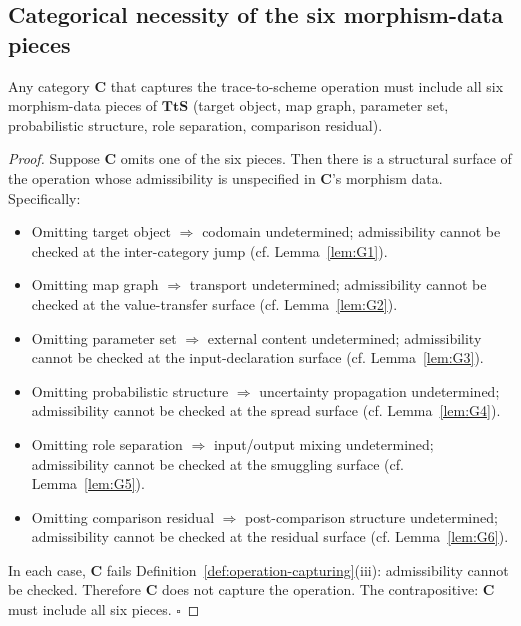 \subsection{Categorical necessity of the six morphism-data pieces}
\label{subsec:cat-necessity}

\begin{lemma}
\label{lem:cat-necessity}
Any category $\mathbf{C}$ that captures the trace-to-scheme operation must include all six morphism-data pieces of $\mathbf{TtS}$ (target object, map graph, parameter set, probabilistic structure, role separation, comparison residual).
\end{lemma}

\begin{proof}
Suppose $\mathbf{C}$ omits one of the six pieces. Then there is a structural surface of the operation whose admissibility is unspecified in $\mathbf{C}$'s morphism data. Specifically:
\begin{itemize}
\item Omitting target object $\Rightarrow$ codomain undetermined; admissibility cannot be checked at the inter-category jump (cf. Lemma~\ref{lem:G1}).
\item Omitting map graph $\Rightarrow$ transport undetermined; admissibility cannot be checked at the value-transfer surface (cf. Lemma~\ref{lem:G2}).
\item Omitting parameter set $\Rightarrow$ external content undetermined; admissibility cannot be checked at the input-declaration surface (cf. Lemma~\ref{lem:G3}).
\item Omitting probabilistic structure $\Rightarrow$ uncertainty propagation undetermined; admissibility cannot be checked at the spread surface (cf. Lemma~\ref{lem:G4}).
\item Omitting role separation $\Rightarrow$ input/output mixing undetermined; admissibility cannot be checked at the smuggling surface (cf. Lemma~\ref{lem:G5}).
\item Omitting comparison residual $\Rightarrow$ post-comparison structure undetermined; admissibility cannot be checked at the residual surface (cf. Lemma~\ref{lem:G6}).
\end{itemize}
In each case, $\mathbf{C}$ fails Definition~\ref{def:operation-capturing}(iii): admissibility cannot be checked. Therefore $\mathbf{C}$ does not capture the operation. The contrapositive: $\mathbf{C}$ must include all six pieces. $\square$
\end{proof}

